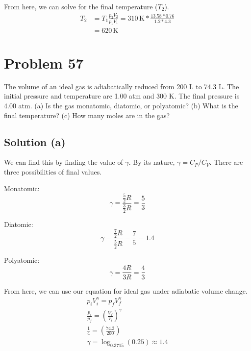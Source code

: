 \documentclass[12pt]{article}
\begin{document}
            From here, we can solve for the final temperature ($T_2$).
            \begin{align}
                T_2 &=  T_1 \frac{p_2 V_2}{p_1 V_1}
                    =   310\,\unit{\kelvin} * \frac{13.58 * 0.76}{1.2 * 4.3}\\
                    &=  \boxed{620\,\unit{\kelvin}}
            \end{align}

    \pagebreak
    \section{Problem 57}
        The volume of an ideal gas is adiabatically reduced from 200 L to 74.3 L. 
        The initial pressure and temperature are 1.00 atm and 300 K. 
        The final pressure is 4.00 atm. 
        (a) Is the gas monatomic, diatomic, or polyatomic? 
        (b) What is the final temperature? 
        (c) How many moles are in the gas?

        \subsection{Solution (a)}
            We can find this by finding the value of $\gamma$.
            By its nature, $\gamma = C_P / C_V$.
            There are three possibilities of final values.

            Monatomic: 
            \begin{equation}
                \gamma  =   \frac{\frac{5}{2}R}{\frac{3}{2}R}
                    =   \frac{5}{3}
            \end{equation}

            Diatomic:
            \begin{equation}
                \gamma  =   \frac{\frac{7}{2}R}{\frac{5}{2}R}
                    =   \frac{7}{5}
                    =   1.4
            \end{equation}

            Polyatomic: 
            \begin{equation}
                \gamma  =   \frac{4R}{3R} = \frac{4}{3}
            \end{equation}

            From here, we can use our equation for ideal gas under adiabatic volume change.
            \begin{gather}
                p_i V_i^\gamma  =   p_f V_f^\gamma\\
                \frac{p_i}{p_f} =   \left( \frac{V_f}{V_i} \right)^\gamma\\
                \frac{1}{4}     =   \left( \frac{74.3}{200} \right)\\
                \gamma  =   \log_{0.3715} (0.25)
                    \approx 1.4
            \end{gather}
\end{document}
